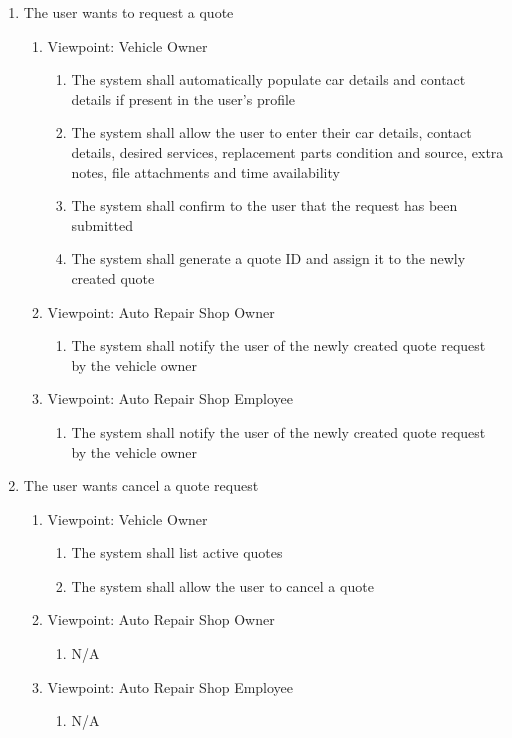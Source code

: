 \documentclass[12pt]{article}
\begin{document}
\begin{enumerate}[resume*=business_events]
	\item The user wants to request a quote
	      \begin{enumerate}[VP\arabic*.]
		      \item Viewpoint: Vehicle Owner
		            \begin{enumerate}
			            \item The system shall automatically populate car details and contact details if present in the user's
			                  profile
			            \item The system shall allow the user to enter their car details, contact details, desired services,
			                  replacement parts condition and source, extra notes, file attachments and time availability
			            \item The system shall confirm to the user that the request has been submitted
			            \item The system shall generate a quote ID and assign it to the newly created quote
		            \end{enumerate}
		      \item Viewpoint: Auto Repair Shop Owner
		            \begin{enumerate}
			            \item The system shall notify the user of the newly created quote request by the vehicle owner
		            \end{enumerate}
		      \item Viewpoint: Auto Repair Shop Employee
		            \begin{enumerate}
			            \item The system shall notify the user of the newly created quote request by the vehicle owner
		            \end{enumerate}
	      \end{enumerate}

	\item The user wants cancel a quote request
	      \begin{enumerate}[VP\arabic*.]
		      \item Viewpoint: Vehicle Owner
		            \begin{enumerate}
			            \item The system shall list active quotes
			            \item The system shall allow the user to cancel a quote
		            \end{enumerate}
		      \item Viewpoint: Auto Repair Shop Owner
		            \begin{enumerate}
			            \item[] N/A
		            \end{enumerate}
		      \item Viewpoint: Auto Repair Shop Employee
		            \begin{enumerate}
			            \item[] N/A
		            \end{enumerate}
	      \end{enumerate}


\end{enumerate}
\end{document}
